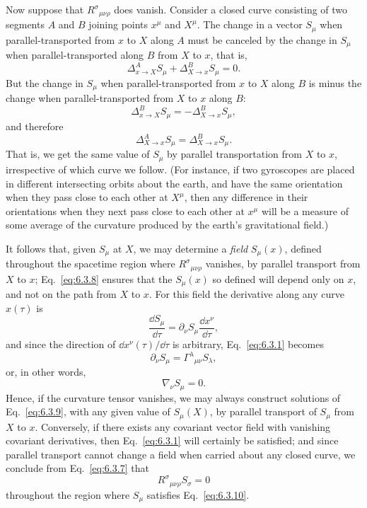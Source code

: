 Now suppose that \(R^\sigma{}_{\mu\nu\rho}\) does vanish. Consider a closed
curve consisting of two segments \(A\) and \(B\) joining points \(x^\mu\) and
\(X^\mu\). The change in a vector \(S_\mu\) when parallel-transported from
\(x\) to \(X\) along \(A\) must be canceled by the change in \(S_\mu\) when
parallel-transported along \(B\) from \(X\) to \(x\), that is,
\[
  \Delta^A_{x\to X}S_\mu+\Delta^B_{X\to x}S_\mu=0.
\]
But the change in \(S_\mu\) when parallel-transported from \(x\) to \(X\)
along \(B\) is minus the change when parallel-transported from \(X\) to \(x\)
along \(B\):
\[
  \Delta^B_{x\to X}S_\mu=-\Delta^B_{X\to x}S_\mu,
\]
and therefore
\begin{equation}
  \Delta^A_{X\to x}S_\mu
  =
  \Delta^B_{X\to x}S_\mu.
  \tag{6.3.8}\label{eq:6.3.8}
\end{equation}
That is, we get the same value of \(S_\mu\) by parallel transportation from
\(X\) to \(x\), irrespective of which curve we follow. (For instance, if two
gyroscopes are placed in different intersecting orbits about the earth, and
have the same orientation when they pass close to each other at \(X^\mu\),
then any difference in their orientations when they next pass close to each
other at \(x^\mu\) will be a measure of some average of the curvature produced
by the earth's gravitational field.)

It follows that, given \(S_\mu\) at \(X\), we may determine a \emph{field}
\(S_\mu(x)\), defined throughout the spacetime region where
\(R^\sigma{}_{\mu\nu\rho}\) vanishes, by parallel transport from \(X\) to
\(x\); Eq.~\eqref{eq:6.3.8} ensures that the \(S_\mu(x)\) so defined will
depend only on \(x\), and not on the path from \(X\) to \(x\). For this field
the derivative along any curve \(x(\tau)\) is
\[
  \frac{\dd S_\mu}{\dd\tau}
  =
  \partial_\nu S_\mu\frac{\dd x^\nu}{\dd\tau},
\]
and since the direction of \(\dd x^\nu(\tau)/\dd\tau\) is arbitrary,
Eq.~\eqref{eq:6.3.1} becomes
\begin{equation}
  \partial_\nu S_\mu
  =
  \Gamma^\lambda{}_{\mu\nu}S_\lambda,
  \tag{6.3.9}\label{eq:6.3.9}
\end{equation}
or, in other words,
\begin{equation}
  \nabla_\nu S_\mu=0.
  \tag{6.3.10}\label{eq:6.3.10}
\end{equation}
Hence, if the curvature tensor vanishes, we may always construct solutions of
Eq.~\eqref{eq:6.3.9}, with any given value of \(S_\mu(X)\), by parallel
transport of \(S_\mu\) from \(X\) to \(x\). Conversely, if there exists any
covariant vector field with vanishing covariant derivatives, then
Eq.~\eqref{eq:6.3.1} will certainly be satisfied; and since parallel
transport cannot change a field when carried about any closed curve, we
conclude from Eq.~\eqref{eq:6.3.7} that
\begin{equation}
  R^\sigma{}_{\mu\nu\rho}S_\sigma=0
  \tag{6.3.11}\label{eq:6.3.11}
\end{equation}
throughout the region where \(S_\mu\) satisfies Eq.~\eqref{eq:6.3.10}.

